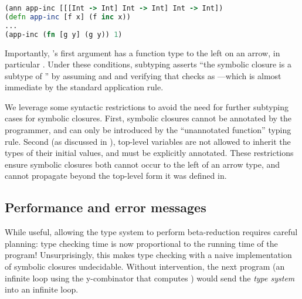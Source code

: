 \begin{lstlisting}[language=Clojure]
(ann app-inc [[[Int -> Int] Int -> Int] Int -> Int])
(defn app-inc [f x] (f inc x))
...
(app-inc (fn [g y] (g y)) 1)
\end{lstlisting}

Importantly, 's first argument has a function
type to the left on an arrow, in particular .
Under these conditions, subtyping asserts ``the symbolic
closure  is a subtype of ''
by assuming  and  and
verifying that  checks as ---which is almost immediate by
the standard application rule.

We leverage some syntactic restrictions
to avoid the need for further subtyping cases for symbolic closures.
First, symbolic closures cannot be annotated by the programmer,
and can only be introduced by the ``unannotated function'' typing rule.
Second (as discussed in ),
top-level variables are not allowed to inherit the types of their initial
values, and must be explicitly annotated.
These restrictions ensure symbolic closures both cannot occur to the
left of an arrow type, and 
cannot propagate beyond the top-level form it was defined in.

\subsection{Performance and error messages}


While useful, allowing the type system to perform beta-reduction
requires careful planning: type checking time is now proportional 
to the running time of the program!
Unsurprisingly, this makes type checking with a naive implementation of symbolic
closures undecidable.
Without intervention,
the next program (an infinite loop using the y-combinator that computes )
would send the \emph{type system} into an infinite loop.


